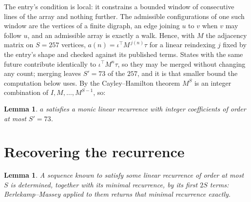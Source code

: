 \documentclass[11pt,a4paper]{article}
\theoremstyle{plain}
\newtheorem{lemma}[theorem]{Lemma}
\theoremstyle{definition}
\begin{document}
The entry's condition is local: it constrains a bounded window of consecutive lines of the
array and nothing further. The admissible configurations of one such window are the vertices
of a finite digraph, an edge joining $u$ to $v$ when $v$ may follow $u$, and an admissible
array is exactly a walk. Hence, with $M$ the adjacency matrix on $S=257$ vertices,
$a(n)=\iota^{\!\top}M^{\,j(n)}\tau$ for a linear reindexing $j$ fixed by the entry's shape
and checked against its published terms. States with the same future contribute identically to $\iota^{\!\top}M^n\tau$, so they may be merged without changing any count; merging leaves $S'=73$ of the $257$, and it is that smaller bound the computation below uses. By the Cayley--Hamilton theorem $M^{S}$ is an
integer combination of $I,M,\dots,M^{S-1}$, so:

\begin{lemma}\label{lem:cf}
$a$ satisfies a monic linear recurrence with integer coefficients of order at most
$S'=73$.
\end{lemma}

\section{Recovering the recurrence}

\begin{lemma}\label{lem:bm}
A sequence known to satisfy some linear recurrence of order at most $S$ is determined, together
with its minimal recurrence, by its first $2S$ terms: Berlekamp--Massey applied to them returns
that minimal recurrence exactly.
\end{lemma}
\end{document}
